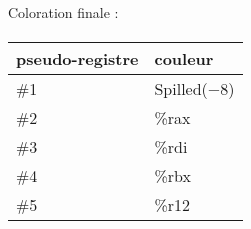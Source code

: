 \paragraph{}
Coloration finale :
\paragraph{}
\begin{tabular}{l|l}
  pseudo-registre & couleur \\
  \hline
  \#1 & Spilled($-8$) \\
\#2 & \%rax \\
\#3 & \%rdi \\
\#4 & \%rbx \\
\#5 & \%r12 \\
\end{tabular}

